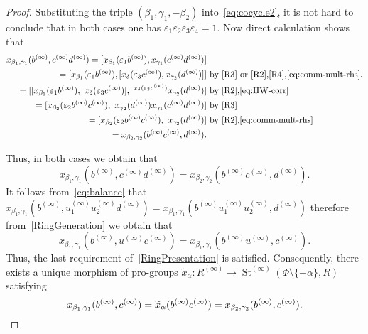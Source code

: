 \documentclass[oneside, 11pt]{amsart}
\numberwithin{equation}{section}
\theoremstyle{definition}
\theoremstyle{remark}
\DeclareMathOperator\St{St}
\begin{document}
\begin{proof}
 Substituting the triple $(\beta_1, \gamma_1, -\beta_2)$ into~\eqref{eq:cocycle2}, it is not hard to conclude that in both cases one has $\varepsilon_1 \varepsilon_2 \varepsilon_3 \varepsilon_4 = 1$. Now direct calculation shows that
 \begin{align*}
x_{\beta_1, \gamma_1}(b^{(\infty)}, c^{(\infty)} d^{(\infty)}) = [x_{\beta_1}(\varepsilon_1b^{(\infty)}), x_{\gamma_1}(c^{(\infty)} d^{(\infty)})] & \nonumber \\
= [x_{\beta_1}(\varepsilon_1b^{(\infty)}), [x_{\delta}(\varepsilon_3c^{(\infty)}), x_{\gamma_2}(d^{(\infty)})]] &\text{  by~\eqref{R3} or~\eqref{R2},\eqref{R4},\eqref{eq:comm-mult-rhs}.} \nonumber \\ 
= [[x_{\beta_1}(\varepsilon_1b^{(\infty)}),\ x_\delta(\varepsilon_3c^{(\infty)})],\ {}^{x_\delta(\varepsilon_3c^{(\infty)})}x_{\gamma_2}(d^{(\infty)})] & \text{ by~\eqref{R2},\eqref{eq:HW-corr}}\\
= [x_{\beta_2}(\varepsilon_2b^{(\infty)}c^{(\infty)}),\ x_{\gamma_2}(d^{(\infty)}) x_{\gamma_1}(c^{(\infty)}d^{(\infty)}) ] & \text{ by~\eqref{R3}}\\
= [x_{\beta_2}(\varepsilon_2b^{(\infty)}c^{(\infty)}),\ x_{\gamma_2}(d^{(\infty)})] &\text{ by~\eqref{R2},\eqref{eq:comm-mult-rhs}} \\
= x_{\beta_2, \gamma_2}(b^{(\infty)} c^{(\infty)}, d^{(\infty)}). & \end{align*}

 Thus, in both cases we obtain that
 \begin{equation}\label{eq:balance}
 x_{\beta_1, \gamma_1}(b^{(\infty)}, c^{(\infty)} d^{(\infty)}) = x_{\beta_2, \gamma_2}(b^{(\infty)} c^{(\infty)}, d^{(\infty)}).
 \end{equation}
 It follows from~\eqref{eq:balance} that $x_{\beta_1,\gamma_1}(b^{(\infty)}, u_1^{(\infty)}u_2^{(\infty)}d^{(\infty)}) = x_{\beta_1,\gamma_1}(b^{(\infty)}u_1^{(\infty)}u_2^{(\infty)},d^{(\infty)})$ therefore from~\cref{RingGeneration} we obtain that
 \[x_{\beta_1, \gamma_1}(b^{(\infty)}, u^{(\infty)} c^{(\infty)}) = x_{\beta_1, \gamma_1}(b^{(\infty)} u^{(\infty)}, c^{(\infty)}).\]
 Thus, the last requirement of~\cref{RingPresentation} is satisfied. Consequently, there exists a unique morphism of pro-groups \(\widetilde x_\alpha \colon R^{(\infty)} \to \St^{(\infty)}(\Phi \setminus \{\pm \alpha\}, R)\) satisfying
 \[x_{\beta_1, \gamma_1}(b^{(\infty)}, c^{(\infty)}) = \widetilde x_\alpha(b^{(\infty)} c^{(\infty)}) = x_{\beta_2, \gamma_2}(b^{(\infty)}, c^{(\infty)}). \qedhere\]
\end{proof}
\end{document}
